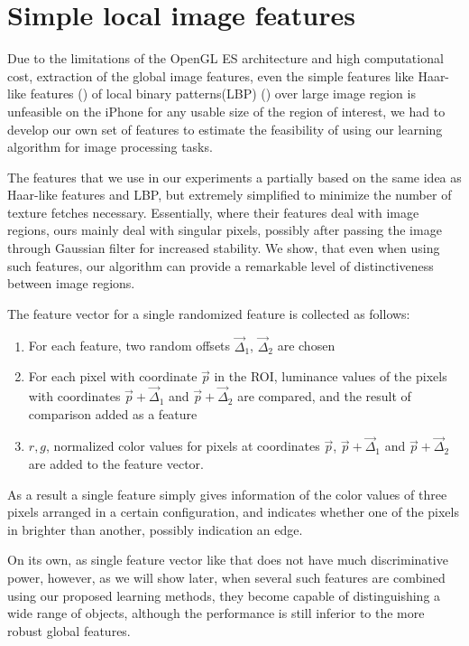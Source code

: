 \section{Simple local image features}

Due to the limitations of the OpenGL ES architecture and high computational cost, extraction of the global image features, even the simple features like Haar-like features (\cite{viola}) of local binary patterns(LBP) (\cite{LBP}) over large image region is unfeasible on the iPhone for any usable size of the region of interest, we had to develop our own set of features to estimate the feasibility of using our learning algorithm for image processing tasks.

The features that we use in our experiments a partially based on the same idea as Haar-like features and LBP, but extremely simplified to minimize the number of texture  fetches necessary. Essentially, where their features deal with image regions, ours mainly deal with singular pixels, possibly after passing the image through Gaussian filter for increased stability. We show, that even when using such features, our algorithm can provide a remarkable level of distinctiveness between image regions.

The feature vector for a single randomized feature is collected as follows:
\begin{enumerate}
\item For each feature, two random offsets $\vec{\Delta}_1$, $\vec{\Delta}_2$ are chosen
\item For each pixel with coordinate $\vec{p}$ in the ROI, luminance values of the pixels with coordinates $\vec{p}+\vec{\Delta}_1$ and $\vec{p}+\vec{\Delta}_2 $ are compared, and the result of comparison added as a feature
\item $r,g$, normalized color values for pixels at coordinates $\vec{p}$, $\vec{p}+\vec{\Delta}_1$ and $\vec{p}+\vec{\Delta}_2 $ are added to the feature vector.
\end{enumerate} 

As a result a single feature simply gives information of the color values of three pixels arranged in a certain configuration, and indicates whether one of the pixels in brighter than another, possibly indication an edge.

On its own, as single feature vector like that does not have much discriminative power, however, as we will show later, when several such features are combined using our proposed learning methods, they become capable of distinguishing a wide range of objects, although the performance is still inferior to the more robust global features. 
